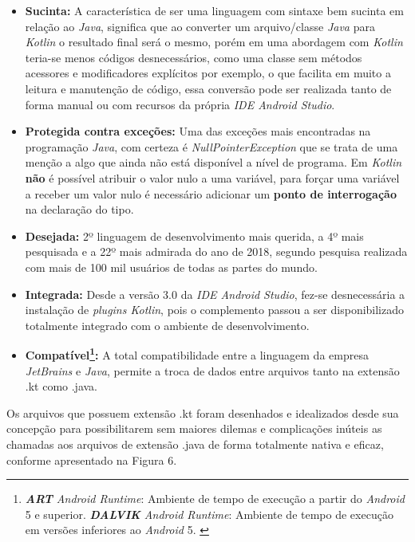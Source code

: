 \begin{itemize}
\item \textbf{Sucinta:} A característica de ser uma linguagem com sintaxe bem sucinta em relação ao \textit{Java}, significa que ao converter um arquivo/classe \textit{Java} para \textit{Kotlin} o resultado final será o mesmo, porém em uma abordagem com \textit{Kotlin} teria-se menos códigos desnecessários, como uma classe sem métodos acessores e modificadores explícitos por exemplo, o que facilita em muito a leitura e manutenção de código, essa conversão pode ser realizada tanto de forma manual ou com recursos da própria \textit{IDE Android Studio}. %

\item \textbf{Protegida contra exceções:} Uma das exceções mais encontradas na programação \textit{Java}, com certeza é \textit{NullPointerException} que se trata de uma menção a algo que ainda não está disponível a nível  de programa. Em \textit{Kotlin} \textbf{não} é possível atribuir o valor nulo a uma variável, para forçar uma variável a receber um valor nulo é necessário adicionar um \textbf{ponto de interrogação} na declaração do tipo. %

\item \textbf{Desejada:} 2º linguagem de desenvolvimento mais querida, a 4º mais pesquisada e a 22º mais admirada do ano de 2018, segundo pesquisa realizada com mais de 100 mil usuários de todas as partes do mundo. %

\item \textbf{Integrada:} Desde a versão 3.0 da \textit{IDE Android Studio}, fez-se desnecessária a instalação de \textit{plugins Kotlin}, pois o complemento passou a ser disponibilizado totalmente integrado com o ambiente de desenvolvimento.%

\item \textbf{Compatível\footnote{ \textit{\textbf{ART} Android Runtime}: Ambiente de tempo de execução a partir do \textit{Android} 5 e superior.
\textit{\textbf{DALVIK} Android Runtime}: Ambiente de tempo de execução em versões inferiores ao \textit{Android} 5. \cite{ArtDalvik}}:} A total compatibilidade entre a linguagem da empresa \textit{JetBrains} e \textit{Java}, permite a troca de dados entre arquivos tanto na extensão .kt como .java. %
\end{itemize}

Os arquivos que possuem extensão .kt foram desenhados e idealizados desde sua concepção para possibilitarem sem maiores dilemas e complicações inúteis as chamadas aos arquivos de extensão .java de forma totalmente nativa e eficaz, conforme apresentado na Figura 6. %

